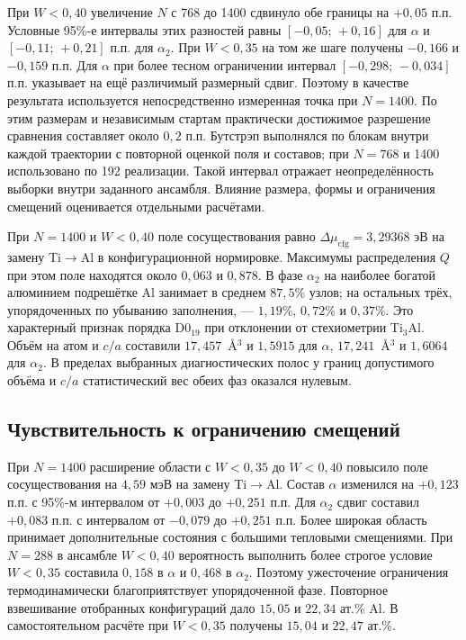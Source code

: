 При $W<0{,}40$ увеличение $N$ с 768 до 1400 сдвинуло обе границы
на $+0{,}05$ п.п. Условные 95\%-е интервалы этих разностей равны
$[-0{,}05;\,+0{,}16]$ для $\alpha$ и $[-0{,}11;\,+0{,}21]$ п.п.
для $\alpha_2$. При $W<0{,}35$ на том же шаге получены
$-0{,}166$ и $-0{,}159$ п.п. Для $\alpha$ при более тесном
ограничении интервал $[-0{,}298;\,-0{,}034]$ п.п. указывает на
ещё различимый размерный сдвиг. Поэтому в качестве результата
используется непосредственно измеренная точка при $N=1400$.
По этим размерам и независимым стартам практически достижимое
разрешение сравнения составляет около $0{,}2$ п.п. Бутстрэп
выполнялся по блокам внутри каждой траектории с повторной оценкой
поля и составов; при $N=768$ и 1400 использовано по 192 реализации.
Такой интервал отражает неопределённость выборки внутри заданного
ансамбля. Влияние размера, формы и ограничения смещений оценивается
отдельными расчётами.

При $N=1400$ и $W<0{,}40$ поле сосуществования равно
$\Delta\mu_{\mathrm{cfg}}=3{,}29368$ эВ на замену Ti$\to$Al
в конфигурационной нормировке. Максимумы распределения $Q$ при
этом поле находятся около $0{,}063$ и $0{,}878$. В фазе $\alpha_2$
на наиболее богатой алюминием подрешётке Al занимает в среднем
$87{,}5\%$ узлов; на остальных трёх, упорядоченных по убыванию
заполнения, --- $1{,}19\%$, $0{,}72\%$ и $0{,}37\%$.
Это характерный признак порядка D0$_{19}$ при отклонении от
стехиометрии Ti$_3$Al. Объём на атом и $c/a$ составили
$17{,}457$~\AA$^3$ и $1{,}5915$ для $\alpha$, $17{,}241$~\AA$^3$
и $1{,}6064$ для $\alpha_2$. В пределах выбранных диагностических
полос у границ допустимого объёма и $c/a$ статистический вес обеих
фаз оказался нулевым.

\subsection{Чувствительность к ограничению смещений}

При $N=1400$ расширение области с $W<0{,}35$ до $W<0{,}40$
повысило поле сосуществования на $4{,}59$ мэВ на замену
Ti$\to$Al. Состав $\alpha$ изменился на $+0{,}123$ п.п.
с 95\%-м интервалом от $+0{,}003$ до $+0{,}251$ п.п.
Для $\alpha_2$ сдвиг составил $+0{,}083$ п.п. с интервалом
от $-0{,}079$ до $+0{,}251$ п.п.
Более широкая область принимает дополнительные состояния с
большими тепловыми смещениями. При $N=288$ в ансамбле $W<0{,}40$
вероятность выполнить более строгое условие $W<0{,}35$ составила
$0{,}158$ в $\alpha$ и $0{,}468$ в $\alpha_2$. Поэтому ужесточение
ограничения термодинамически благоприятствует упорядоченной фазе.
Повторное взвешивание отобранных конфигураций дало
$15{,}05$ и $22{,}34$ ат.\% Al. В самостоятельном расчёте
при $W<0{,}35$ получены $15{,}04$ и $22{,}47$ ат.\%.

